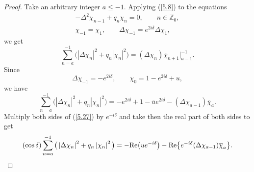 \documentclass[11pt]{article}
\numberwithin{equation}{section}
\begin{document}
\begin{proof}
Take an arbitrary integer $a\leq -1.$ Applying (\ref{5.8}) to the equations%
\begin{gather*}
-\Delta ^{2}\chi _{n-1}+q_{n}\chi _{n}=0,\qquad n\in
\mathbb{Z}
_{0},
\\
\chi _{-1}=\chi _{1},\qquad \Delta \chi _{-1}=e^{2i\delta }\Delta \chi
_{1},
\end{gather*}
we get%
\[
\sum_{n=a}^{-1}\big( \left\vert \Delta \chi _{n}\right\vert
^{2}+q_{n}\left\vert \chi _{n}\right\vert ^{2}\big) =(\Delta \chi _{n})%
\overline{\chi }_{n+1}\big|_{a-1}^{-1}.
\]%
Since%
\[
\Delta \chi _{-1}=-e^{2i\delta },\qquad \chi _{0}=1-e^{2i\delta }+u,
\]%
we have%
\begin{equation}
\sum_{n=a}^{-1}\big( \left\vert \Delta \chi _{n}\right\vert
^{2}+q_{n}\left\vert \chi _{n}\right\vert ^{2}\big) =-e^{2i\delta }+1-%
\overline{u}e^{2i\delta }-(\Delta \chi _{a-1})\overline{\chi }_{a}.
\label{5.27}
\end{equation}%
Multiply both sides of (\ref{5.27}) by $e^{-i\delta }$ and take then the
real part of both sides to get%
\begin{equation}
(\cos \delta )\sum_{n=a}^{-1}\big( \left\vert \Delta \chi _{n}\right\vert
^{2}+q_{n}\left\vert \chi _{n}\right\vert ^{2}\big) =-{\rm Re}
\big(ue^{-i\delta }\big)-{\rm Re}\big\{ e^{-i\delta }(\Delta \chi _{a-1})%
\overline{\chi }_{a}\big\} .  \label{5.28}
\end{equation}


\end{proof}
\end{document}
